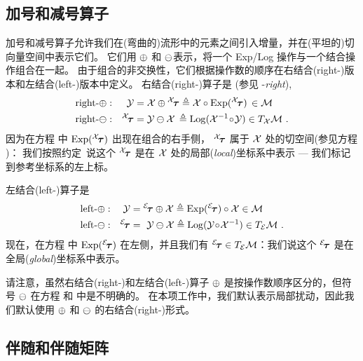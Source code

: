 \subsection{加号和减号算子}

加号和减号算子允许我们在(弯曲的)流形中的元素之间引入增量，并在(平坦的)切向量空间中表示它们。
它们用 $\oplus$ 和 $\ominus$表示，将一个 Exp/Log 操作与一个结合操作组合在一起。
由于组合的非交换性，它们根据操作数的顺序在右结合(right-)版本和左结合(left-)版本中定义。
右结合(right-)算子是 (参见 -\emph{right}), 
%
\begin{align}
\textrm{right-}\oplus:&& \mathcal{Y} &= \mathcal{X}\oplus{^{\mathcal{X}}\!{\bm \tau}} \triangleq \mathcal{X}\circ\operatorname*{Exp}({^{\mathcal{X}}\!{\bm \tau}}) \,\in \mathcal{M} \label{equ:rplus} \\
\textrm{right-}\ominus:&& {^{\mathcal{X}}\!{\bm \tau}} &= \mathcal{Y}\ominus\mathcal{X} \,\triangleq \operatorname*{Log}(\mathcal{X}^{-1}\!\circ\!\mathcal{Y})\in T_{\mathcal{X}}{\mathcal{M}} \label{equ:rminus}
~.
\end{align}
%
因为在方程  中 $\operatorname*{Exp}({^{\mathcal{X}}\!{\bm \tau}})$ 出现在组合的右手侧，
${^{\mathcal{X}}\!{\bm \tau}}$ 属于 $\mathcal{X}$ 处的切空间(参见方程 )： 
我们按照约定\footnotemark~说这个 ${^{\mathcal{X}}\!{\bm \tau}}$ 是在 $\mathcal{X}$ 处的局部(\emph{local})坐标系中表示 --- 我们标记到参考坐标系的左上标。

左结合(left-)算子是
\begin{align}
\textrm{left-}\oplus:&&\mathcal{Y}&={^{\mathcal{E}}\!{\bm \tau}}\oplus\mathcal{X} \triangleq \operatorname*{Exp}({^{\mathcal{E}}\!{\bm \tau}})\circ\mathcal{X} \in \mathcal{M} \label{equ:lplus} \\
\textrm{left-}\ominus:&&{^{\mathcal{E}}\!{\bm \tau}}&=~\mathcal{Y}\ominus\mathcal{X} \triangleq \operatorname*{Log}(\mathcal{Y}\!\circ\!\mathcal{X}^{-1})\in T_{\mathcal{E}}{\mathcal{M}}
\label{equ:lminus}
~.
\end{align}
%
现在，在方程  中 $\operatorname*{Exp}({^{\mathcal{E}}\!{\bm \tau}})$ 在左侧，并且我们有 ${{^{\mathcal{E}}\!{\bm \tau}}\in T_{\mathcal{E}}{\mathcal{M}}}$：我们说这个 ${{^{\mathcal{E}}}\!{\bm \tau}}$ 是在全局(\emph{global})坐标系中表示。

请注意，虽然右结合(right-)和左结合(left-)算子 $\oplus$ 是按操作数顺序区分的，但符号 $\ominus$ 在方程  和  中是不明确的。
在本项工作中，我们默认表示局部扰动，因此我们默认使用 $\oplus$ 和 $\ominus$ 的右结合(right-)形式。


\subsection[Adjoint, and adjoint matrix]{伴随和伴随矩阵}
\label{sec:adjoint}

